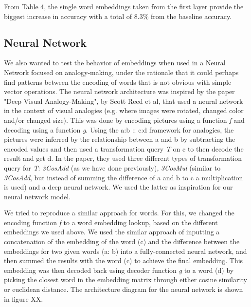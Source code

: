 \documentclass[11pt]{article}
\begin{document}


From Table 4, the single word embeddings taken from the first layer
provide the biggest increase in accuracy with a total of 8.3\% from the
baseline accuracy.

\subsection{Neural Network}

We also wanted to test the behavior of embeddings when used in a Neural
Network focused on analogy-making, under the rationale that it could
perhaps find patterns between the encoding of words that is not obvious
with simple vector operations. The neural network architecture was
inspired by the paper "Deep Visual Analogy-Making", by Scott Reed et al,
that used a neural network in the context of visual analogies (e.g.
where images were rotated, changed color and/or changed size). This was
done by encoding pictures using a function \emph{f} and decoding using a
function \emph{g}. Using the a:b :: c:d framework for analogies, the
pictures were inferred by the relationship between a and b by
subtracting the encoded values and then used a transformation query
\emph{T} on c to then decode the result and get d. In the paper, they
used three different types of transformation query for \emph{T}:
\emph{3CosAdd} (as we have done previously), \emph{3CosMul} (similar to
\emph{3CosAdd}, but instead of summing the difference of a and b to c a
multiplication is used) and a deep neural network. We used the latter as
inspiration for our neural network model.

We tried to reproduce a similar approach for words. For this, we changed
the encoding function \emph{f} to a word embedding lookup, based on the
different embeddings we used above. We used the similar approach of
inputting a concatenation of the embedding of the word (c) and the
difference between the embeddings for two given words (a: b) into a
fully-connected neural network, and then summed the results with the
word (c) to achieve the final embedding. This embedding was then decoded
back using decoder function \emph{g }to a word (d) by picking the
closest word in the embedding matrix through either cosine similarity or
euclidean distance. The architecture diagram for the neural network is
shown in figure XX.
\end{document}
